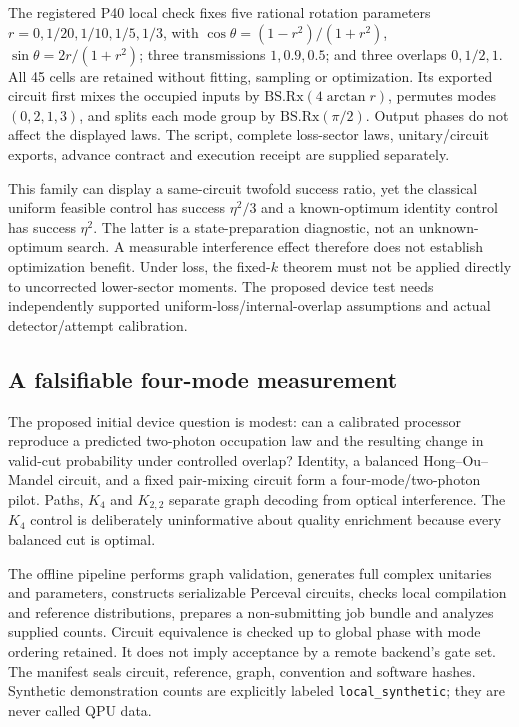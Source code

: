 \documentclass[11pt,a4paper]{article}
\theoremstyle{remark}\newtheorem{remark}[theorem]{Remark}
\begin{document}
The registered P40 local check fixes five rational rotation parameters $r=0,1/20,1/10,1/5,1/3$, with $\cos\theta=(1-r^2)/(1+r^2)$, $\sin\theta=2r/(1+r^2)$; three transmissions $1,0.9,0.5$; and three overlaps $0,1/2,1$. All 45 cells are retained without fitting, sampling or optimization. Its exported circuit first mixes the occupied inputs by $\mathrm{BS.Rx}(4\arctan r)$, permutes modes $(0,2,1,3)$, and splits each mode group by $\mathrm{BS.Rx}(\pi/2)$. Output phases do not affect the displayed laws. The script, complete loss-sector laws, unitary/circuit exports, advance contract and execution receipt are supplied separately.

This family can display a same-circuit twofold success ratio, yet the classical uniform feasible control has success $\eta^2/3$ and a known-optimum identity control has success $\eta^2$. The latter is a state-preparation diagnostic, not an unknown-optimum search. A measurable interference effect therefore does not establish optimization benefit. Under loss, the fixed-$k$ theorem must not be applied directly to uncorrected lower-sector moments. The proposed device test needs independently supported uniform-loss/internal-overlap assumptions and actual detector/attempt calibration.

\subsection{A falsifiable four-mode measurement}
The proposed initial device question is modest: can a calibrated processor reproduce a predicted two-photon occupation law and the resulting change in valid-cut probability under controlled overlap? Identity, a balanced Hong--Ou--Mandel circuit, and a fixed pair-mixing circuit form a four-mode/two-photon pilot. Paths, $K_4$ and $K_{2,2}$ separate graph decoding from optical interference. The $K_4$ control is deliberately uninformative about quality enrichment because every balanced cut is optimal.

The offline pipeline performs graph validation, generates full complex unitaries and parameters, constructs serializable Perceval circuits, checks local compilation and reference distributions, prepares a non-submitting job bundle and analyzes supplied counts. Circuit equivalence is checked up to global phase with mode ordering retained. It does not imply acceptance by a remote backend's gate set. The manifest seals circuit, reference, graph, convention and software hashes. Synthetic demonstration counts are explicitly labeled \texttt{local\_synthetic}; they are never called QPU data.
\end{document}
